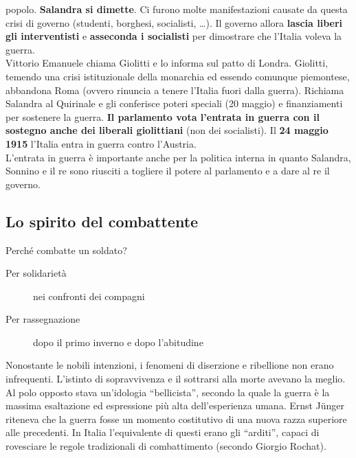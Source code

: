 popolo. \textbf{Salandra si dimette}. Ci furono molte manifestazioni causate da questa crisi di
governo (studenti, borghesi, socialisti, \ldots). Il governo allora \textbf{lascia liberi gli
interventisti} e \textbf{asseconda i socialisti} per dimostrare che l'Italia voleva la guerra.\\
Vittorio Emanuele  chiama Giolitti e lo informa sul patto di Londra. Giolitti, temendo una
crisi istituzionale della monarchia ed essendo comunque piemontese, abbandona Roma (ovvero rinuncia
a tenere l'Italia fuori dalla guerra). Richiama Salandra al Quirinale e gli conferisce poteri 
speciali (20 maggio) e finanziamenti per sostenere la guerra. \textbf{Il parlamento vota l'entrata in
guerra con il sostegno anche dei liberali giolittiani} (non dei socialisti). Il 
\textbf{24 maggio 1915} l'Italia entra in guerra contro l'Austria.\\
L'entrata in guerra è importante anche per la politica interna in quanto Salandra, Sonnino e il re 
sono riusciti a togliere il potere al parlamento e a dare al re il governo.

\subsection{Lo spirito del combattente}
Perché combatte un soldato?
\begin{description}
  \item[Per solidarietà] nei confronti dei compagni
  \item[Per rassegnazione] dopo il primo inverno e dopo l'abitudine
\end{description}
Nonostante le nobili intenzioni, i fenomeni di diserzione e ribellione non erano infrequenti. 
L'istinto di sopravvivenza e il sottrarsi alla morte avevano la meglio.\\
Al polo opposto stava un'idologia ``bellicista'', secondo la quale la guerra è la massima 
esaltazione ed espressione più alta dell'esperienza umana. Ernst Jünger riteneva che la guerra 
fosse un momento costitutivo di una nuova razza superiore alle precedenti. In Italia l'equivalente
di questi erano gli ``arditi'', capaci di rovesciare le regole tradizionali di combattimento (secondo
Giorgio Rochat).

